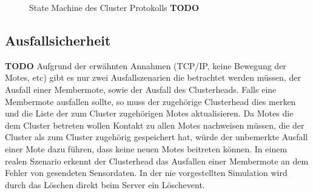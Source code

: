 \begin{figure*}
\label{fig:sm}
\caption{State Machine des Cluster Protokolls \textbf{TODO}}
\end{figure*}
\subsection{Ausfallsicherheit} \textbf{TODO}
Aufgrund der erw\"ahnten Annahmen (TCP/IP, keine Bewegung der Motes, etc) gibt es nur zwei Ausfallszenarien die betrachtet werden m\"ussen, der Ausfall einer Membermote,  sowie der Ausfall des Clusterheads.
Falls eine Membermote ausfallen sollte, so muss der zugeh\"orige Clusterhead dies merken und die Liste der zum Cluster zugeh\"origen Motes aktualisieren.
Da Motes die dem Cluster betreten wollen Kontakt zu allen Motes nachweisen m\"ussen, die der Cluster als zum Cluster zugeh\"orig gespeichert hat, w\"urde der unbemerkte Ausfall einer Mote dazu f\"uhren, dass keine neuen Motes beitreten k\"onnen.
In einem realen Szenario erkennt der Clusterhead das Ausfallen einer Membermote an dem Fehler von gesendeten Sensordaten. In der nie vorgestellten Simulation wird durch das L\"oschen direkt beim Server ein L\"oschevent.

